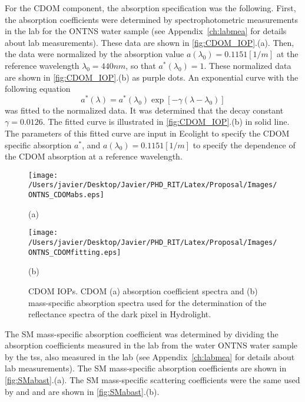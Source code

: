 For the CDOM component, the absorption specification was the following. First, the absorption coefficients were determined by spectrophotometric measurements in the lab for the ONTNS water sample (see Appendix~\ref{ch:labmea} for details about lab measurements). These data are shown in \autoref{fig:CDOM_IOP}.(a). Then, the data were normalized by the absorption value $a(\lambda_0)=0.1151[1/m]$ at the reference wavelength $\lambda_0=440nm$, so that $a^*(\lambda_0)=1$. These normalized data are shown in \autoref{fig:CDOM_IOP}.(b) as purple dots. An exponential curve with the following equation
\begin{equation}
	\label{eq:CDOMabs}
	a^*(\lambda)=a^*(\lambda_0)\exp{\left[-\gamma(\lambda-\lambda_0)\right]}
\end{equation}
was fitted to the normalized data. It was determined that the decay constant $\gamma=0.0126$. The fitted curve is illustrated in \autoref{fig:CDOM_IOP}.(b) in solid line. The parameters of this fitted curve are input in Ecolight to specify the CDOM specific absorption $a^*$, and $a(\lambda_0)=0.1151[1/m]$ to specify the dependence of the CDOM absorption at a reference wavelength.

\begin{figure}[!ht]
  \begin{minipage}[c]{0.48\linewidth}
  	\centering
  	\texttt{[image: /Users/javier/Desktop/Javier/PHD\_RIT/Latex/Proposal/Images/ONTNS\_CDOMabs.eps]}
    \centerline{(a)}\medskip
  \end{minipage} 
  \hfill 
  \begin{minipage}[c]{0.48\linewidth}
  	\centering
  	\texttt{[image: /Users/javier/Desktop/Javier/PHD\_RIT/Latex/Proposal/Images/ONTNS\_CDOMfitting.eps]}
    \centerline{(b)}\medskip
  \end{minipage}    
  \caption{CDOM IOPs. CDOM (a) absorption coefficient spectra and (b) mass-specific absorption spectra used for the determination of the reflectance spectra of the dark pixel in Hydrolight. \label{fig:CDOM_IOP} } 
\end{figure}

The SM mass-specific absorption coefficient was determined by dividing the absorption coefficients measured in the lab from the water ONTNS water sample by the \gls{tss}, also measured in the lab (see Appendix~\ref{ch:labmea} for details about lab measurements). The SM mass-specific absorption coefficients are shown in \autoref{fig:SMabast}.(a). The SM mass-specific scattering coefficients were the same used by \citet{Raqueno:2000} and \citet{Raqueno:2003} and are shown in \autoref{fig:SMabast}.(b).

